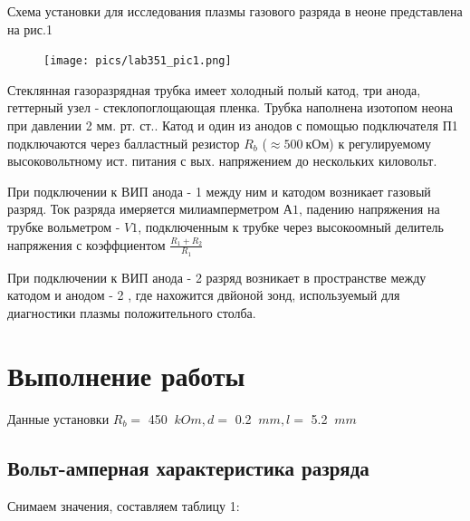 Схема установки для исследования плазмы газового разряда в неоне представлена на рис.1

\begin{figure}[h!]
\begin{center}
\texttt{[image: pics/lab351\_pic1.png]}
\end{center}
\end{figure}

Стеклянная газоразрядная трубка имеет холодный полый катод, три анода, геттерный узел - стеклопоглощающая пленка. Трубка наполнена изотопом неона при давлении 2 мм. рт. ст.. Катод и один из анодов с помощью подключателя П1 подключаются через балластный резистор $R_b$ ($\approx 500 \: \text{кОм}$) к регулируемому высоковольтному ист. питания с вых. напряжением до нескольких киловольт.

При подключении к ВИП анода - 1 между ним и катодом возникает газовый разряд. Ток разряда имеряется милиамперметром $А1$, падению напряжения на трубке вольметром - $V1$, подключенным к трубке через высокоомный делитель напряжения с коэффциентом $\frac{R_1 + R_2}{R_1}$

При подключении к ВИП анода - 2 разряд возникает в пространстве между катодом и анодом - 2 , где нахожится двйоной зонд, используемый для диагностики плазмы положительного столба. 




\section{Выполнение работы}

Данные установки $R_b = $ 450 $\: kOm, d = $ 0.2 $\: mm, l =$  5.2 $\: mm$

 \subsection{Вольт-амперная характеристика разряда}

Снимаем значения, составляем таблицу 1:
                
